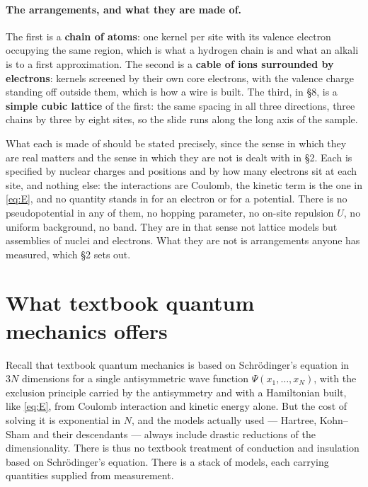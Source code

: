 \documentclass[11pt]{article}
\begin{document}
\paragraph{The arrangements, and what they are made of.} The first is a \textbf{chain of atoms}:
one kernel per site with its valence electron occupying the same region, which is what a hydrogen
chain is and what an alkali is to a first approximation. The second is a \textbf{cable of ions
surrounded by electrons}: kernels screened by their own core electrons, with the valence charge
standing off outside them, which is how a wire is built. The third, in \S8, is a \textbf{simple cubic
lattice} of the first: the same spacing in all three directions, three chains by three by eight
sites, so the slide runs along the long axis of the sample.

What each is made of should be stated precisely, since the sense in which they are real matters and
the sense in which they are not is dealt with in \S2. Each is specified by nuclear charges and
positions and by how many electrons sit at each site, and nothing else: the interactions are
Coulomb, the kinetic term is the one in \eqref{eq:E}, and no quantity stands in for an electron or
for a potential. There is no pseudopotential in any of them, no hopping parameter, no on-site
repulsion $U$, no uniform background, no band. They are in that sense not lattice models but
assemblies of nuclei and electrons. What they are not is arrangements anyone has measured, which
\S2 sets out.

\section{What textbook quantum mechanics offers}

Recall that textbook quantum mechanics is based on Schr\"odinger's equation in $3N$ dimensions for a
single antisymmetric wave function $\Psi(x_1,\dots,x_N)$, with the exclusion principle carried by the
antisymmetry and with a Hamiltonian built, like \eqref{eq:E}, from Coulomb interaction and kinetic
energy alone.
But the cost of solving it is exponential in $N$, and the models actually used --- Hartree,
Kohn--Sham and their descendants --- always include drastic reductions of the dimensionality. There
is thus no textbook treatment of conduction and insulation based on Schr\"odinger's equation. There
is a stack of models, each carrying quantities supplied from measurement.
\end{document}
